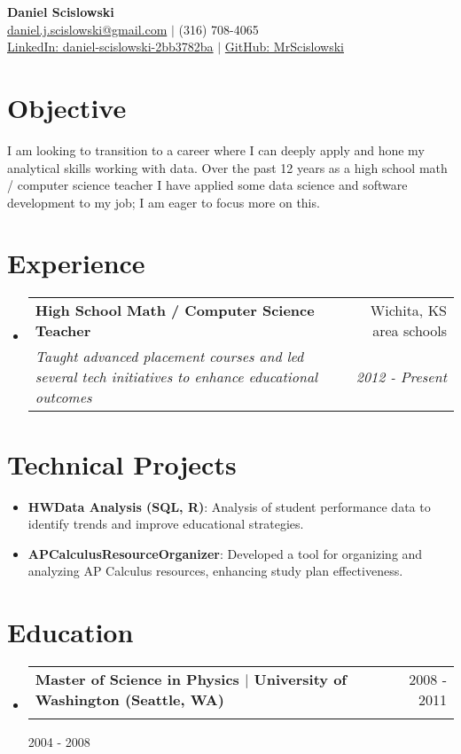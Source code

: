 \documentclass[11pt, a4paper]{article}
\makeatletter
\newcommand{\resumeSubheading}[4]{
  \vspace{-1pt}\item[]
    \begin{tabular*}{0.97\textwidth}[t]{l@{\extracolsep{\fill}}r}
      \textbf{#1} & #2 \\
      \textit{\small#3} & \textit{\small #4} \\
    \end{tabular*}\vspace{-5pt}
}
\newcommand{\resumeEducation}[4]{
  \resumeSubheading{#1}{#2}{}{}
}
\newcommand{\resumeExperience}[4]{
  \resumeSubheading{#1}{#2}{#3}{#4}
}
\newcommand{\resumeProject}[2]{
  \item[]
    \textbf{#1}{: #2}
}
\makeatother
\begin{document}
\begin{center}
    {\LARGE \bf Daniel Scislowski} \\
    \vspace{2pt}
    \small \href{mailto:daniel.j.scislowski@gmail.com}{daniel.j.scislowski@gmail.com} $\vert$ (316) 708-4065 \\
    \small \href{https://linkedin.com/in/daniel-scislowski-2bb3782ba}{LinkedIn: daniel-scislowski-2bb3782ba} $\vert$ \href{https://github.com/MrScislowski}{GitHub: MrScislowski}
\end{center}

\section*{Objective}
\small 

I am looking to transition to a career where I can deeply apply and hone my analytical skills working with data. Over the past 12 years as a high school math / computer science teacher I have applied some data science and software development to my job; I am eager to focus more on this.

\section*{Experience}
\begin{itemize}[leftmargin=*]
  \resumeExperience
      {High School Math / Computer Science Teacher}{Wichita, KS area schools}
      {Taught advanced placement courses and led several tech initiatives to enhance educational outcomes}{2012 - Present}
\end{itemize}

\section*{Technical Projects}
\begin{itemize}[leftmargin=*]
  \resumeProject
      {HWData Analysis (SQL, R)}
      {Analysis of student performance data to identify trends and improve educational strategies.}
  \resumeProject
      {APCalculusResourceOrganizer}
      {Developed a tool for organizing and analyzing AP Calculus resources, enhancing study plan effectiveness.}
\end{itemize}


\section*{Education}
\begin{itemize}[leftmargin=*]
  \resumeEducation
      {Master of Science in Physics $\vert$ University of Washington (Seattle, WA)}{2008 - 2011}
  \resumeEducation
      {Bachelor of Science in Physics $\vert$ University of Manchester (Manchester, UK)}{2004 - 2008}
\end{itemize}
\end{document}
